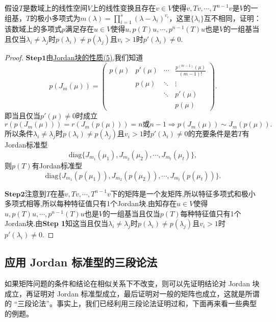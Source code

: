 \documentclass[../../main.tex]{subfiles}
\begin{document}
\begin{example}
假设\( T \)是数域上的线性空间\( V \)上的线性变换且存在\( v \in V \)使得\( v,Tv,\cdots,T^{n-1}v \)是\( V \)的一组基，\( T \)的极小多项式为\( m(\lambda)=\prod_{i=1}^{s}(\lambda-\lambda_i)^{v_i} \)，这里\( \{\lambda_i\} \)互不相同，证明：该数域上的多项式\( p \)满足存在\( u \in V \)使得\( u,p(T)u,\cdots,p^{n-1}(T)u \)也是\( V \)的一组基当且仅当\( \lambda_i \neq \lambda_j \)时\( p(\lambda_i) \neq p(\lambda_j) \)且\( v_i > 1 \)时\( p'(\lambda_i) \neq 0 \).
\end{example}
\begin{proof}
$\mathbf{Step}\mathbf{1}$由\hyperref[proposition:Jordan块的性质]{Jordan块的性质(5)},我们知道
\[
p\left(J_m(\mu)\right)=\begin{pmatrix}
p(\mu)& p'(\mu)& \cdots& \frac{p^{(m-1)}(\mu)}{(m-1)!}\\
& p(\mu)& \ddots& \vdots\\
& & \ddots& p'(\mu)\\
& & & p(\mu)
\end{pmatrix}.
\]
即当且仅当$p'(\mu)\neq 0$时成立
\[
r\left( p\left( J_m(\mu ) \right) \right) =r\left( J_m(p(\mu )) \right) =n\text{或}n-1\Longrightarrow 
p\left(J_m(\mu)\right)\sim J_m(p(\mu)).
\]
所以条件$\lambda_i\neq \lambda_j$时$p(\lambda_i)\neq p(\lambda_j)$且$v_i>1$时$p'(\lambda_i)\neq 0$的充要条件是若$T$有Jordan标准型
\[
\text{diag}\{J_{m_1}(\mu_1),J_{m_2}(\mu_2),\cdots,J_{m_t}(\mu_t)\},
\]
则$p(T)$有Jordan标准型
\[
\text{diag}\{J_{m_1}(p(\mu_1)),J_{m_2}(p(\mu_2)),\cdots,J_{m_t}(p(\mu_t))\}.
\]

$\mathbf{Step}\mathbf{2}$注意到$T$在基$v,Tv,\cdots,T^{n-1}v$下的矩阵是一个友矩阵,所以特征多项式和极小多项式相等,所以每种特征值只有1个Jordan块.由知存在$u\in V$使得$u,p(T)u,\cdots,p^{n-1}(T)u$也是$V$的一组基当且仅当$p(T)$每种特征值只有1个Jordan块.由\textbf{Step 1}知这当且仅当$\lambda_i\neq \lambda_j$时$p(\lambda_i)\neq p(\lambda_j)$且$v_i>1$时$p'(\lambda_i)\neq 0$.
\end{proof}









\subsection{应用 Jordan 标准型的三段论法}
 
如果矩阵问题的条件和结论在相似关系下不改变，则可以先证明结论对 Jordan 块成立，再证明对 Jordan 标准型成立，最后证明对一般的矩阵也成立，这就是所谓的 “三段论法”。事实上，我们已经利用三段论法证明过和，下面再来看一些典型的例题。
\end{document}
